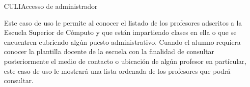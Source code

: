 \begin{UseCase}{CULI}{Accesso de administrador}
	{
		Este caso de uso le permite al  conocer el listado de los profesores adscritos a la Escuela Superior de Cómputo y que están impartiendo clases en ella o que se encuentren cubriendo algún puesto administrativo.
		Cuando el alumno requiera conocer la plantilla docente de la escuela con la finalidad de consultar posteriormente el medio de contacto o ubicación de algún profesor en partícular, este caso de uso le mostrará una lista ordenada de los profesores que podrá consultar. 
			
		}
		
		
		

\end{UseCase}
